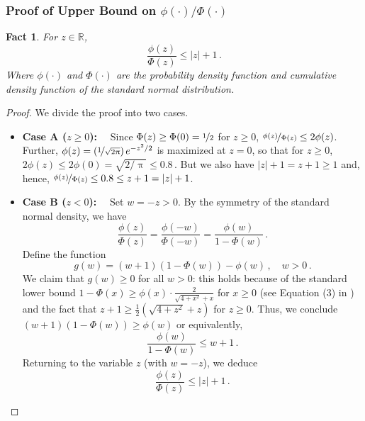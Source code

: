\documentclass[11pt,letterpaper]{article}
\theoremstyle{plain}
\newtheorem{fact}[theorem]{Fact}
\theoremstyle{definition}
\theoremstyle{remark}
\newcommand{\sinparen}[1]{\ensuremath{(#1)}}
\newcommand{\inparen}[1]{\ensuremath{\left(#1\right)}}
\newcommand{\R}{\mathbb{R}}
\newcommand{\sfrac}[2]{{#1/#2}}
\newcommand{\nfrac}[2]{\nicefrac{#1}{#2}}
\renewcommand{\pi}{\uppi}
\begin{document}
{{{        \subsubsection*{Proof of Upper Bound on $\sfrac{\phi(\cdot)}{\Phi(\cdot)}$}
        \begin{fact}\label{fact:BoundOnMillsLikeRatio}
            For $z\in \R$,
            \[
                \frac{\phi(z)}{\Phi(z)} \le |z| + 1\,.
            \]
            Where $\phi(\cdot)$ and $\Phi(\cdot)$ are the probability density function and cumulative density function of the standard normal distribution.
        \end{fact}
        \begin{proof}
            We divide the proof into two cases.
            \begin{itemize}
                \item \textbf{Case A ($z\geq 0$):}~~
                    Since \(\Phi(z)\ge \Phi(0)=\nfrac{1}{2}\) for \(z\ge 0\), $\nfrac{\phi(z)}{\Phi(z)} \le 2\phi(z)$.
                    Further, $\phi(z)=\inparen{\nfrac{1}{\sqrt{2\pi}}}e^{-z^2/2}$ is maximized at \(z=0\), so that for \(z\ge 0\), $2\phi(z) \le 2\phi(0)=\sqrt{\sfrac{2}{\pi}} \le 0.8\,.$
                    But we also have \(|z|+1=z+1\ge 1\) and, hence, $\nfrac{\phi(z)}{\Phi(z)} \le 0.8 \le z+1 = |z|+1$.
                \item \textbf{Case B ($z < 0$):}~~
                    Set \(w=-z>0\). By the symmetry of the standard normal density, we have
                    \[
                        \frac{\phi(z)}{\Phi(z)} = \frac{\phi(-w)}{\Phi(-w)} = \frac{\phi(w)}{1-\Phi(w)}\,.
                    \]
                    Define the function
                    \[
                        g(w) = (w+1)(1-\Phi(w)) - \phi(w)\,,\quad w>0\,.
                    \]
                    We claim that \(g(w)\ge 0\) for all \(w>0\): this holds because of the standard lower bound $1-\Phi(x)\geq \phi(x) \cdot \frac{2}{\sqrt{4+x^2}+x}$ for $x\geq 0$ (see  Equation (3) in \citet{duembgen2010boundingstandardgaussiantail}) and the fact that $z+1\geq \frac{1}{2}\sinparen{\sqrt{4+z^2}+z}$ for $z\geq 0$.
                    Thus, we conclude $(w+1)(1-\Phi(w)) \ge \phi(w)$ or equivalently,
                    \[
                    \frac{\phi(w)}{1-\Phi(w)} \le w+1\,.
                    \]
                    Returning to the variable \(z\) (with \(w=-z\)), we deduce
                    \[
                    \frac{\phi(z)}{\Phi(z)} \le |z| + 1\,.
                    \]
            \end{itemize}
        \end{proof}
         

}}}
\end{document}
